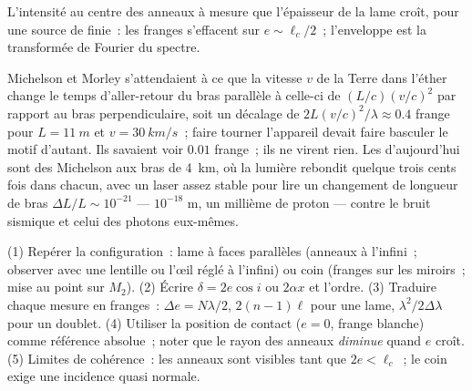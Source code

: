 \begin{omfigure}

{\small L'intensité au centre des anneaux à mesure que l'épaisseur de la lame
croît, pour une source de  finie~: les franges s'effacent sur
$e \sim \ell_c/2$~; l'enveloppe est la transformée de Fourier du spectre.}
\end{omfigure}

\begin{remark}\label{rem:b2:michelson:history}
Michelson et Morley s'attendaient à ce que la vitesse $v$ de la Terre dans
l'éther change le temps d'aller-retour du bras parallèle à celle-ci de
$(L/c)(v/c)^2$ par rapport au bras perpendiculaire, soit un décalage de
$2L(v/c)^2/\lambda \approx 0.4$ frange pour $L = \qty{11}{m}$ et $v = \qty{30}{km/s}$~;
faire tourner l'appareil devait faire basculer le motif d'autant.
Ils savaient voir $0.01$ frange~; ils ne virent rien. Les  d'aujourd'hui sont des Michelson aux bras de \qty{4}{km}, où la lumière rebondit
quelque trois cents fois dans chacun, avec un laser assez stable pour lire un
changement de longueur de bras $\Delta L/L \sim 10^{-21}$ --- $10^{-18}$ m, un millième
de proton --- contre le bruit sismique et celui des photons
eux-mêmes.
\end{remark}

\begin{method}\label{met:b2:michelson:method}
(1) Repérer la configuration~: lame à faces parallèles (anneaux à l'infini~;
observer avec une lentille ou l'œil réglé à l'infini) ou coin (franges sur les
miroirs~; mise au point sur $M_2$). (2) Écrire $\delta = 2e\cos i$ ou $2\alpha x$ et
l'ordre. (3) Traduire chaque mesure en franges~: $\Delta e = N\lambda/2$,
$2(n - 1)\ell$ pour une lame, $\lambda^2/2\Delta\lambda$ pour un doublet. (4) Utiliser la
position de contact ($e = 0$, frange blanche) comme référence absolue~;
noter que le rayon des anneaux \emph{diminue} quand $e$ croît. (5) Limites
de cohérence~: les anneaux sont visibles tant que $2e < \ell_c$~; le coin exige une
incidence quasi normale.
\end{method}

